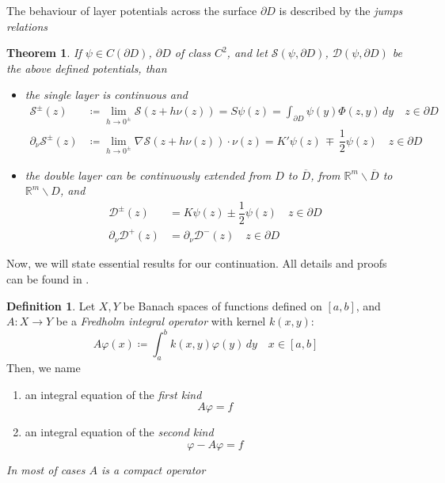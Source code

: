 \documentclass[10pt, a4paper, twoside, openright]{book}
\theoremstyle{definition}
\newtheorem{definition}[subsection]{Definition}
\theoremstyle{plain}
\newtheorem{theorem}[subsection]{Theorem}
\theoremstyle{plain}
\theoremstyle{plain}
\theoremstyle{plain}
\theoremstyle{plain}
\theoremstyle{plain}
\theoremstyle{plain}
\theoremstyle{plain}
\let\phi\varphi
\begin{document}
The behaviour of layer potentials across the surface $\partial D$ is described by the \emph{jumps relations}
\begin{theorem}
 If $\psi\in C(\partial D)$, $\partial D$ of class $C^2$, and let $\mathcal{S}(\psi,\partial D)$, $\mathcal{D}(\psi,\partial D)$ be the above defined potentials, than
 \begin{itemize}
  \item the single layer is continuous and 
  \begin{subequations}
  \begin{align}
   \mathcal{S}^\pm(z) &\coloneqq\lim_{h\to 0^\pm}\mathcal{S}(z+h\nu(z)) = S\psi(z)=\int_{\partial D}\psi(y)\Phi(z,y)\,dy \quad z\in\partial D \label{eq:single-pm-0}\\
   \partial_\nu\mathcal{S}^\pm(z) &\coloneqq \lim_{h\to0^\pm} \nabla\mathcal{S}(z+h\nu(z))\cdot\nu(z) =  K'\psi(z) \,\mp\,\dfrac{1}{2}\psi(z) \quad z\in\partial D\label{eq:single-pm-1}
  \end{align}
 \end{subequations}
 \item the double layer can be continuously extended from $D$ to $\overline{D}$, from $\mathbb{R}^m\backslash \overline{D}$ to $\mathbb{R}^m\backslash D$, and
  \begin{subequations}
  \begin{align}
   \mathcal{D}^\pm(z) &= K\psi(z) \pm\dfrac{1}{2}\psi(z)\quad z\in\partial D \label{eq:double-pm-0}\\
   \partial_\nu\mathcal{D}^+(z) &= \partial_\nu\mathcal{D}^-(z) \quad z\in\partial D\label{eq:double-pm-1}
  \end{align}
  \end{subequations}
 \end{itemize}
\end{theorem}

Now, we will state essential results for our continuation.
All details and proofs can be found in \cite{kress:book}.
\begin{definition}
 Let $X,Y$ be Banach spaces of functions defined on $[a,b]$, and $A:X\to Y$ be a \emph{Fredholm integral operator} with kernel $k(x,y)$:
 \begin{equation}
  A\phi(x)\coloneqq\int_a^b k(x,y)\phi(y)\,dy\quad x\in[a,b]
 \end{equation}
 Then, we name
 \begin{enumerate}
  \item an integral equation of the \emph{first kind}
   \begin{equation}
    A\phi=f
   \end{equation}
  \item an integral equation of the \emph{second kind}
   \begin{equation}
    \phi - A\phi=f
   \end{equation}
 \end{enumerate}
\emph{In most of cases $A$ is a compact operator}
\end{definition}
\end{document}
